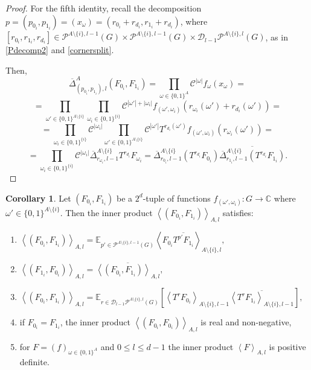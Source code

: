 \documentclass{amsart}
\theoremstyle{definition}
\newtheorem{corollary}[theorem]{Corollary}
\theoremstyle{remark}
\numberwithin{equation}{section}
\begin{document}
\begin{proof}
 For the fifth identity, recall the decomposition $p=(p_{0_i}, p_{1_i}) = (x_\omega)= (r_{0_i}+r_{d_i},r_{1_i}+r_{d_i})$, where $[r_{0_i}, r_{1_i},r_{d_i}] \in \mathcal{P}^{A\setminus \{i\},l-1}(G) \times \mathcal{P}^{A\setminus \{i\},l-1}(G) \times \mathcal{D}_{l-1}\mathcal{P}^{A \setminus \{i\},l}(G)$, as in \eqref{Pdecomp2} and \eqref{cornersplit}.
 
 Then, 
 $$\overline{\Delta}^A_{(p_{0_i},p_{1_i}),l} (F_{0_i}, F_{1_i})= \prod_{\omega \in \{0,1\}^A} \mathcal{C}^{|\omega|} f_\omega (x_\omega) = $$
 $$ = \prod_{\omega' \in \{0,1\}^{A \setminus \{i\}}} \prod_{\omega_i \in \{0,1\}^{\{i\}}} \mathcal{C}^{|\omega'|+|\omega_i|} f_{(\omega', \omega_i)} (r_{\omega_i}(\omega') + r_{d_i}(\omega')) = $$
  $$ = \prod_{\omega_i \in \{0,1\}^{\{i\}}}  \mathcal{C}^{|\omega_i|} \prod_{\omega' \in \{0,1\}^{A \setminus \{i\}}}  \mathcal{C}^{|\omega'|} T^{r_{d_i}(\omega')}f_{(\omega', \omega_i)} (r_{\omega_i}(\omega') ) = $$
$$=  \prod_{\omega_i \in \{0,1\}^{\{i\}}}  \mathcal{C}^{|\omega_i|} 
\overline{\Delta}^{A \setminus \{i\}}_{r_{\omega_i},l-1} T^{r_{d_i}}F_{\omega_i} 
 = \overline{\Delta}^{A\setminus \{i\}}_{r_{0_i},l-1}\left( T^{r_{d_i}}F_{0_i}\right)  \overline{
\overline{\Delta}^{A\setminus \{i\}}_{r_{1_i},l-1}\left( T^{r_{d_i}}F_{1_i}\right)}.
 $$ 
\end{proof}


\begin{corollary} 
\label{cor:Fsplit}
Let $(F_{0_i}, F_{1_i})$ be a $2^d$-tuple of functions $f_{(\omega', \omega_i)}: G \to \mathbb{C}$ where $\omega' \in \{0,1\}^{A \setminus \{i\}}$.
Then the inner product $\left\langle (F_{0_i}, F_{1_i}) \right\rangle_{A,l}$ satisfies:

\renewcommand{\labelenumi}{\roman{enumi})}
\begin{enumerate}
\item
$\displaystyle \left\langle \left(F_{0_i}, F_{1_i}\right) \right\rangle_{A,l} =  \mathbb{E}_{p' \in \mathcal{P}^{A \setminus \{i\},l-1}(G)} \left\langle   F_{0_i} \overline{T^{p'}F_{1_i}}  \right\rangle_{A\setminus\{i\},l}, $
\item
$ \displaystyle \left\langle \left(F_{1_i}, F_{0_i}\right) \right\rangle_{A,l} =  \overline{\left\langle \left(F_{0_i}, F_{1_i}\right) \right\rangle_{A,l}},$
\item $\displaystyle \left\langle \left(F_{0_i}, F_{1_i}\right) \right\rangle_{A,l} =  \mathbb{E}_{r \in \mathcal{D}_{l-1}\mathcal{P}^{A \setminus \{i\},l}(G)} \left[ \left\langle   T^r F_{0_i} \right\rangle_{A\setminus\{i\},l-1}  \overline{ \left\langle   T^r F_{1_i}  \right\rangle_{A\setminus\{i\},l-1}}\right],$

\item if $F_{0_i}= F_{1_i}$, the inner product  $\left\langle \left(F_{0_i}, F_{0_i}\right) \right\rangle_{A,l}$ is real and non-negative,

\item for $F = \left( f \right)_{\omega \in \{0,1\} ^A}$ and $0 \le l \le d-1$ the inner product $\left\langle F \right\rangle_{A,l}$ is positive definite.
\end{enumerate}
\end{corollary}
\end{document}
